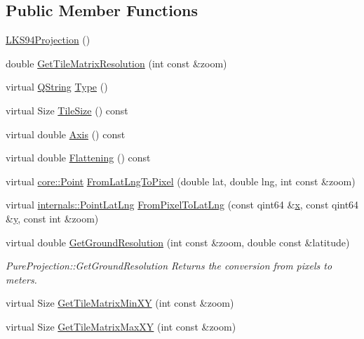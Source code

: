 \subsection*{\-Public \-Member \-Functions}
\begin{DoxyCompactItemize}
\item 
\hyperlink{group___o_p_map_widget_gacf511403f6a470bec942524c0e020b77}{\-L\-K\-S94\-Projection} ()
\item 
double \hyperlink{group___o_p_map_widget_gade26ff9888d408a201247708930b7def}{\-Get\-Tile\-Matrix\-Resolution} (int const \&zoom)
\item 
virtual \hyperlink{group___u_a_v_objects_plugin_gab9d252f49c333c94a72f97ce3105a32d}{\-Q\-String} \hyperlink{group___o_p_map_widget_gae82b8ae052c2f26ea3a4c22e5874555a}{\-Type} ()
\item 
virtual \-Size \hyperlink{group___o_p_map_widget_ga86aa23efcf539805fb69e9ce24d807ec}{\-Tile\-Size} () const 
\item 
virtual double \hyperlink{group___o_p_map_widget_gac4b990882512cc86ba637b3800236a67}{\-Axis} () const 
\item 
virtual double \hyperlink{group___o_p_map_widget_ga16c229c3db71de0b79d22b6101b21d2d}{\-Flattening} () const 
\item 
virtual \hyperlink{structcore_1_1_point}{core\-::\-Point} \hyperlink{group___o_p_map_widget_gadd46e502fee5270e191688b136e895c9}{\-From\-Lat\-Lng\-To\-Pixel} (double lat, double lng, int const \&zoom)
\item 
virtual \hyperlink{structinternals_1_1_point_lat_lng}{internals\-::\-Point\-Lat\-Lng} \hyperlink{group___o_p_map_widget_gaeaf114d1ac8b52fc06bffdd1efd0ed24}{\-From\-Pixel\-To\-Lat\-Lng} (const qint64 \&\hyperlink{_o_p_plots_8m_a9336ebf25087d91c818ee6e9ec29f8c1}{x}, const qint64 \&\hyperlink{_o_p_plots_8m_a2fb1c5cf58867b5bbc9a1b145a86f3a0}{y}, const int \&zoom)
\item 
virtual double \hyperlink{group___o_p_map_widget_ga8ec3073798d3fd7b19d1e62aac216fd7}{\-Get\-Ground\-Resolution} (int const \&zoom, double const \&latitude)
\begin{DoxyCompactList}\small\item\em \-Pure\-Projection\-::\-Get\-Ground\-Resolution \-Returns the conversion from pixels to meters. \end{DoxyCompactList}\item 
virtual \-Size \hyperlink{group___o_p_map_widget_ga86d31a1ce953b8c93d0ee6b7dd4d7db6}{\-Get\-Tile\-Matrix\-Min\-X\-Y} (int const \&zoom)
\item 
virtual \-Size \hyperlink{group___o_p_map_widget_gaa838d53afb098ce93a50200bf0f79dec}{\-Get\-Tile\-Matrix\-Max\-X\-Y} (int const \&zoom)
\end{DoxyCompactItemize}


